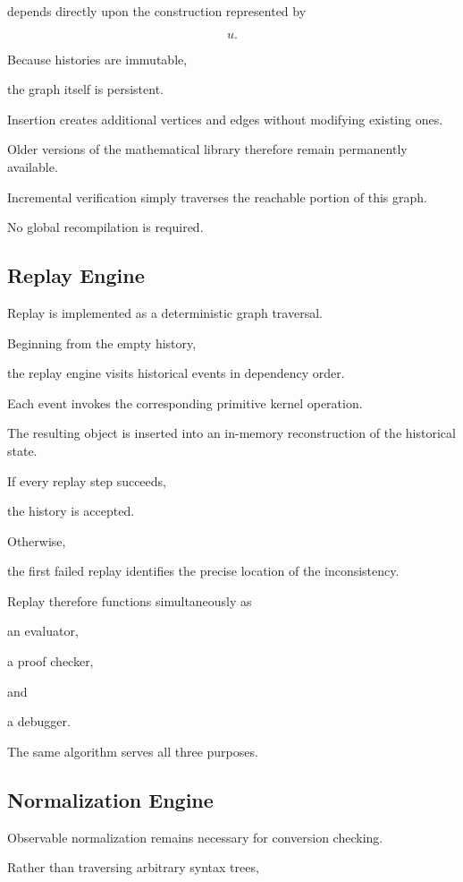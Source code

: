 \documentclass[12pt,oneside]{article}
\theoremstyle{definition}
\theoremstyle{remark}
\begin{document}
depends directly upon the construction represented by

\[
u.
\]

Because histories are immutable,

the graph itself is persistent.

Insertion creates additional vertices and edges without modifying existing
ones.

Older versions of the mathematical library therefore remain permanently
available.

Incremental verification simply traverses the reachable portion of this graph.

No global recompilation is required.

\subsection{Replay Engine}

Replay is implemented as a deterministic graph traversal.

Beginning from the empty history,

the replay engine visits historical events in dependency order.

Each event invokes the corresponding primitive kernel operation.

The resulting object is inserted into an in-memory reconstruction of the
historical state.

If every replay step succeeds,

the history is accepted.

Otherwise,

the first failed replay identifies the precise location of the inconsistency.

Replay therefore functions simultaneously as

an evaluator,

a proof checker,

and

a debugger.

The same algorithm serves all three purposes.

\subsection{Normalization Engine}

Observable normalization remains necessary for conversion checking.

Rather than traversing arbitrary syntax trees,
\end{document}

